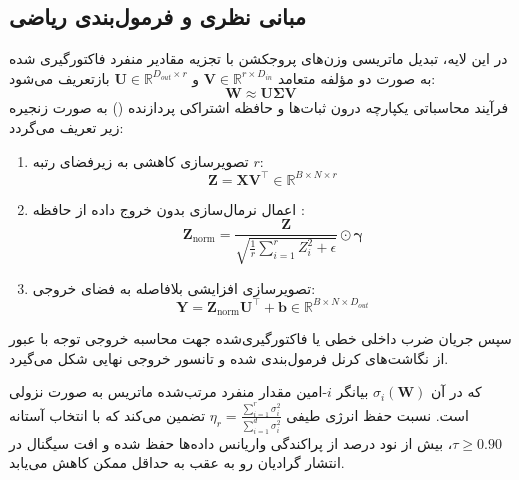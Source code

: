 \subsection{مبانی نظری و فرمول‌بندی ریاضی}
در این لایه، تبدیل ماتریسی وزن‌های پروجکشن با تجزیه مقادیر منفرد فاکتورگیری شده به صورت دو مؤلفه متعامد $\mathbf{V} \in \mathbb{R}^{r \times D_{in}}$ و $\mathbf{U} \in \mathbb{R}^{D_{out} \times r}$ بازتعریف می‌شود:
\begin{equation}
\mathbf{W} \approx \mathbf{U} \mathbf{\Sigma} \mathbf{V}
\end{equation}
فرآیند محاسباتی یکپارچه درون ثبات‌ها و حافظه اشتراکی پردازنده () به صورت زنجیره زیر تعریف می‌گردد:
\begin{enumerate}
    \item تصویرسازی کاهشی به زیرفضای رتبه $r$:
    \begin{equation}
    \mathbf{Z} = \mathbf{X} \mathbf{V}^\top \in \mathbb{R}^{B \times N \times r}
    \end{equation}
    \item اعمال نرمال‌سازی  بدون خروج داده از حافظه :
    \begin{equation}
    \mathbf{Z}_{\text{norm}} = \frac{\mathbf{Z}}{\sqrt{\frac{1}{r} \sum_{i=1}^r Z_i^2 + \epsilon}} \odot \boldsymbol{\gamma}
    \end{equation}
    \item تصویرسازی افزایشی بلافاصله به فضای خروجی:
    \begin{equation}
    \mathbf{Y} = \mathbf{Z}_{\text{norm}} \mathbf{U}^\top + \mathbf{b} \in \mathbb{R}^{B \times N \times D_{out}}
    \end{equation}
\end{enumerate}
سپس جریان ضرب داخلی خطی یا فاکتورگیری‌شده جهت محاسبه خروجی توجه با عبور از نگاشت‌های کرنل فرمول‌بندی شده و تانسور خروجی نهایی شکل می‌گیرد.

که در آن $\sigma_i(\mathbf{W})$ بیانگر $i$-امین مقدار منفرد مرتب‌شده ماتریس به صورت نزولی است. نسبت حفظ انرژی طیفی $\eta_r = \frac{\sum_{i=1}^r \sigma_i^2}{\sum_{i=1}^{d} \sigma_i^2}$ تضمین می‌کند که با انتخاب آستانه $\tau \ge 0.90$، بیش از نود درصد از پراکندگی واریانس داده‌ها حفظ شده و افت سیگنال در انتشار گرادیان رو به عقب به حداقل ممکن کاهش می‌یابد.

